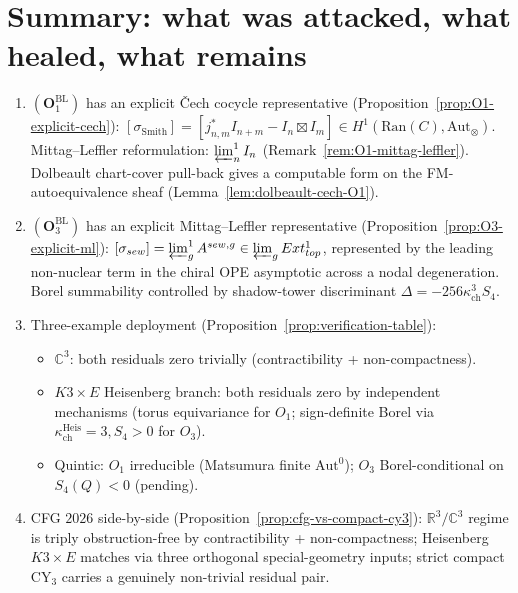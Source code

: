 \documentclass[11pt]{amsart}
\newcommand{\kch}{\kappa_{\mathrm{ch}}}
\newcommand{\Ran}{\mathrm{Ran}}
\newcommand{\bC}{\mathbb{C}}
\newcommand{\bR}{\mathbb{R}}
\newcommand{\Ext}{\mathrm{Ext}}
\newcommand{\Aut}{\mathrm{Aut}}
\begin{document}
\section{Summary: what was attacked, what healed, what remains}
\label{sec:summary}

\begin{enumerate}[leftmargin=2em]
\item $(\mathbf{O}_1^{\mathrm{BL}})$ has an explicit \v{C}ech
cocycle representative (Proposition~\ref{prop:O1-explicit-cech}):
$[\sigma_{\mathrm{Smith}}] = [j^*_{n, m} I_{n+m} - I_n \boxtimes I_m]
\in H^1(\Ran(C), \Aut_\otimes)$. Mittag--Leffler reformulation:
$\varprojlim^1_n I_n$ (Remark~\ref{rem:O1-mittag-leffler}).
Dolbeault chart-cover pull-back gives a computable form on the
FM-autoequivalence sheaf (Lemma~\ref{lem:dolbeault-cech-O1}).

\item $(\mathbf{O}_3^{\mathrm{BL}})$ has an explicit Mittag--Leffler
representative (Proposition~\ref{prop:O3-explicit-ml}):
$[\sigma_{\mathrm{sew}}] = \varprojlim^1_g A^{\mathrm{sew}, g} \in
\varprojlim_g \Ext^1_{\mathrm{top}}$, represented by the leading
non-nuclear term in the chiral OPE asymptotic across a nodal
degeneration. Borel summability controlled by shadow-tower
discriminant $\Delta = -256 \kch^3 S_4$.

\item Three-example deployment
(Proposition~\ref{prop:verification-table}):
\begin{itemize}
\item $\bC^3$: both residuals zero trivially (contractibility +
non-compactness).
\item $K3 \times E$ Heisenberg branch: both residuals zero by
independent mechanisms (torus equivariance for $O_1$; sign-definite
Borel via $\kch^{\mathrm{Heis}} = 3, S_4 > 0$ for $O_3$).
\item Quintic: $O_1$ irreducible (Matsumura finite $\Aut^0$);
$O_3$ Borel-conditional on $S_4(Q) < 0$ (pending).
\end{itemize}

\item CFG $2026$ side-by-side (Proposition~\ref{prop:cfg-vs-compact-cy3}):
$\bR^3 / \bC^3$ regime is triply obstruction-free by
contractibility + non-compactness; Heisenberg $K3 \times E$ matches
via three orthogonal special-geometry inputs; strict compact CY$_3$
carries a genuinely non-trivial residual pair.


\end{enumerate}
\end{document}
